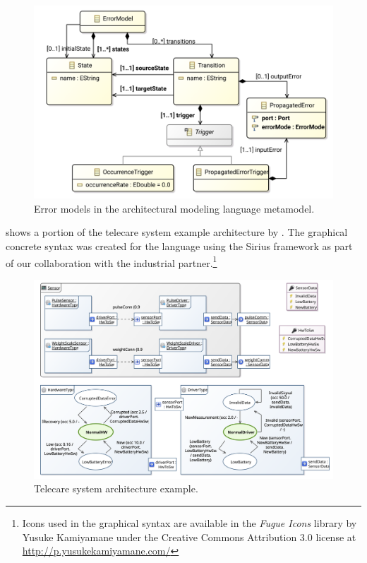 \begin{figure}
  \centering
  \includegraphics[scale=0.825]{figures/depmodel_metamodel_error}
  \caption{Error models in the architectural modeling language metamodel.}
  \label{fig:architecture:error}
\end{figure}

 shows a portion of the telecare system example architecture by \citet[Chapter~7]{Ecsedi16architecture}. The graphical concrete syntax was created for the language using the Sirius framework as part of our collaboration with the industrial partner.\footnote{Icons used in the graphical syntax are available in the \emph{Fugue Icons} library by Yusuke Kamiyamane under the Creative Commons Attribution 3.0 license at \url{http://p.yusukekamiyamane.com/}}

\begin{figure}
  \centering
  \includegraphics[width=\textwidth]{figures/telecare_system}
  \caption{Telecare system architecture example.}
  \label{fig:architecture:telecare}
\end{figure}


